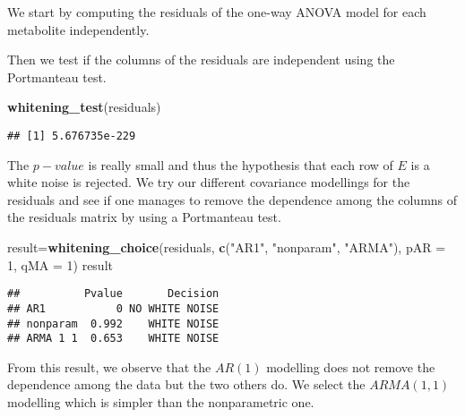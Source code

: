 \documentclass[]{article}
\newenvironment{Shaded}{\begin{snugshade}}{\end{snugshade}}
\newcommand{\KeywordTok}[1]{\textcolor[rgb]{0.13,0.29,0.53}{\textbf{#1}}}
\newcommand{\DataTypeTok}[1]{\textcolor[rgb]{0.13,0.29,0.53}{#1}}
\newcommand{\DecValTok}[1]{\textcolor[rgb]{0.00,0.00,0.81}{#1}}
\newcommand{\StringTok}[1]{\textcolor[rgb]{0.31,0.60,0.02}{#1}}
\newcommand{\OperatorTok}[1]{\textcolor[rgb]{0.81,0.36,0.00}{\textbf{#1}}}
\newcommand{\NormalTok}[1]{#1}
\begin{document}
We start by computing the residuals of the one-way ANOVA model for each
metabolite independently.

\begin{Shaded}
\end{Shaded}

Then we test if the columns of the residuals are independent using the
Portmanteau test.

\begin{Shaded}
\begin{Highlighting}[]
\KeywordTok{whitening_test}\NormalTok{(residuals)}
\end{Highlighting}
\end{Shaded}

\begin{verbatim}
## [1] 5.676735e-229
\end{verbatim}

The \(p-value\) is really small and thus the hypothesis that each row of
\(E\) is a white noise is rejected. We try our different covariance
modellings for the residuals and see if one manages to remove the
dependence among the columns of the residuals matrix by using a
Portmanteau test.

\begin{Shaded}
\begin{Highlighting}[]
\NormalTok{result=}\KeywordTok{whitening_choice}\NormalTok{(residuals, }\KeywordTok{c}\NormalTok{(}\StringTok{"AR1"}\NormalTok{, }\StringTok{"nonparam"}\NormalTok{, }\StringTok{"ARMA"}\NormalTok{), }\DataTypeTok{pAR =} \DecValTok{1}\NormalTok{, }\DataTypeTok{qMA =} \DecValTok{1}\NormalTok{)}
\NormalTok{result}
\end{Highlighting}
\end{Shaded}

\begin{verbatim}
##          Pvalue       Decision
## AR1           0 NO WHITE NOISE
## nonparam  0.992    WHITE NOISE
## ARMA 1 1  0.653    WHITE NOISE
\end{verbatim}

From this result, we observe that the \(AR(1)\) modelling does not
remove the dependence among the data but the two others do. We select
the \(ARMA(1,1)\) modelling which is simpler than the nonparametric one.
\end{document}
